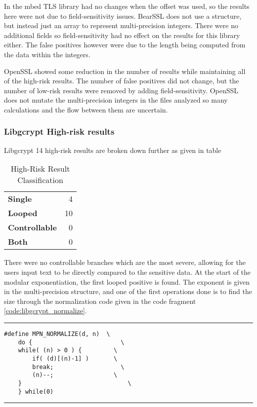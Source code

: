 \documentclass[11pt,a4paper]{article}
\begin{document}
 In the mbed TLS library had no changes when the offset was used, so the results
 here were not due to field-sensitivity issues. BearSSL does not use a structure,
 but instead just an array to represent multi-precision integers. There were no
 additional fields so field-sensitivity had no effect on the results for this
 library either. The false positives however were due to the length being
 computed from the data within the integers.

 OpenSSL showed some reduction in the number of results while maintaining all of
 the high-risk results. The number of false positives did not change, but the
 number of low-risk results were removed by adding field-sensitivity. OpenSSL
 does not mutate the multi-precision integers in the files analyzed so many
 calculations and the flow between them are uncertain. 

\subsubsection{Libgcrypt High-risk results}

Libgcrypt 14 high-risk results are broken down further as given in table

\begin{table}
  \centering
  \begin{tabular}{l r}
    \textbf{Single} & 4 \\
    \textbf{Looped}  & 10 \\
    \textbf{Controllable} & 0 \\
    \textbf{Both}  & 0 \\
  \end{tabular}
  \caption{High-Risk Result Classification}
  \label{tbl:libgcrypt_high}
\end{table}

There were no controllable branches which are the most severe, allowing for the
users input text to be directly compared to the sensitive data. At the start of
the modular exponentiation, the first looped positive is found. The exponent is
given in the multi-precision structure, and one of the first operations done is
to find the size through the normalization code given in the code fragment
\ref{code:libgcrypt_normalize}.

\vspace{5pt}
\hrule
\begin{lstlisting}[caption=Libgcrypt 1.8.2 - mpi-internal.h lines 113-120, label=code:libgcrypt_normalize]
#define MPN_NORMALIZE(d, n)  \
    do {		                 \
	while( (n) > 0 ) {         \
	    if( (d)[(n)-1] )       \
		break;	                 \
	    (n)--;	               \
	}		                       \
    } while(0)
\end{lstlisting}
\hrule
\vspace{5pt}
\end{document}
